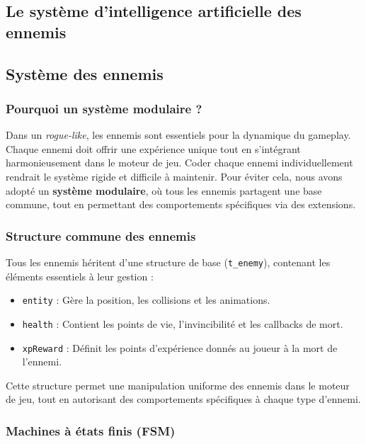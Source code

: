 \documentclass[a4paper,11pt]{article}
\begin{document}
\subsection{Le système d'intelligence artificielle des ennemis}

\subsection{Système des ennemis}

\subsubsection{Pourquoi un système modulaire ?}
\label{sec:systeme_modulaire}

Dans un \textit{rogue-like}, les ennemis sont essentiels pour la dynamique du gameplay. Chaque ennemi doit offrir une expérience unique tout en s’intégrant harmonieusement dans le moteur de jeu. Coder chaque ennemi individuellement rendrait le système rigide et difficile à maintenir.  
Pour éviter cela, nous avons adopté un \textbf{système modulaire}, où tous les ennemis partagent une base commune, tout en permettant des comportements spécifiques via des extensions.

\subsubsection{Structure commune des ennemis}
\label{sec:structure_commune}

Tous les ennemis héritent d’une structure de base (\texttt{t\_enemy}), contenant les éléments essentiels à leur gestion :
\begin{itemize}
    \item \texttt{entity} : Gère la position, les collisions et les animations.
    \item \texttt{health} : Contient les points de vie, l’invincibilité et les callbacks de mort.
    \item \texttt{xpReward} : Définit les points d’expérience donnés au joueur à la mort de l’ennemi.
\end{itemize}

Cette structure permet une manipulation uniforme des ennemis dans le moteur de jeu, tout en autorisant des comportements spécifiques à chaque type d’ennemi.

\subsubsection{Machines à états finis (FSM)}
\label{sec:fsm}
\end{document}
